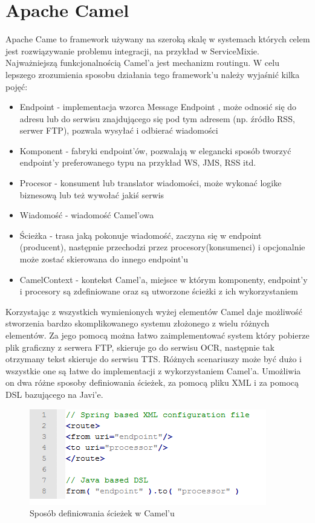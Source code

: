 \section{Apache Camel}
Apache Came\cite{ibsen2010} \cite{camel} to framework używany na szeroką skalę w systemach których celem jest rozwiązywanie problemu integracji, na przykład w ServiceMixie. Najważniejszą funkcjonalnością Camel'a jest mechanizm routingu. W celu lepszego zrozumienia sposobu działania tego framework'u należy wyjaśnić kilka pojęć:
\begin{itemize}
	\item Endpoint - implementacja wzorca Message Endpoint \cite{hohpe2003}, może odnosić się do adresu lub do serwisu znajdującego się pod tym adresem (np. źródło RSS, serwer FTP), pozwala wysyłać i odbierać wiadomości  
	\item Komponent - fabryki endpoint'ów, pozwalają w elegancki sposób tworzyć endpoint'y preferowanego typu na przykład WS, JMS, RSS itd.
	\item Procesor - konsument lub translator wiadomości, może wykonać logike biznesową lub też wywołać jakiś serwis
	\item Wiadomość - wiadomość Camel'owa
	\item Ścieżka - trasa jaką pokonuje wiadomość, zaczyna się w endpoint (producent), następnie przechodzi przez procesory(konsumenci) i opcjonalnie może zostać skierowana do innego endpoint'u 
	\item CamelContext - kontekst Camel'a, miejsce w którym komponenty, endpoint'y i procesory są zdefiniowane oraz są utworzone ścieżki z ich wykorzystaniem
\end{itemize}  
Korzystając z wszystkich wymienionych wyżej elementów Camel daje możliwość stworzenia bardzo skomplikowanego systemu złożonego z wielu różnych elementów. Za jego pomocą można łatwo zaimplementować system który pobierze plik graficzny z serwera FTP, skieruje go do serwisu OCR, następnie tak otrzymany tekst skieruje do serwisu TTS. Różnych scenariuszy może być dużo i wszystkie one są łatwe do implementacji z wykorzystaniem Camel'a. Umożliwia on dwa różne sposoby definiowania ścieżek, za pomocą pliku XML i za pomocą DSL bazującego na Javi'e.
\begin{figure}[!h]
	\centering
	\includegraphics[scale=0.95]{camel.png} 
	\caption{Sposób definiowania ścieżek w Camel'u}
\end{figure}
			
